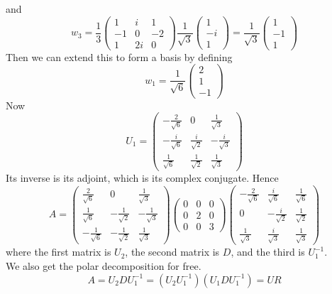 \documentclass[answers]{exam}
\begin{document}
\begin{questions}
\begin{solution}
	and
	$$w_3 = \frac{1}{3} \begin{pmatrix} 1 & i & 1 \\ -1 & 0 & -2 \\ 1 & 2i & 0 \end{pmatrix} \frac{1}{\sqrt{3}} \begin{pmatrix} 1 \\ -i \\ 1 \end{pmatrix} = \frac{1}{\sqrt{3}} \begin{pmatrix} 1 \\ -1 \\ 1 \end{pmatrix}$$
	Then we can extend this to form a basis by defining
	$$w_1 = \frac{1}{\sqrt{6}} \begin{pmatrix} 2 \\ 1 \\ -1 \end{pmatrix}$$
	Now
	$$U_1 = \begin{pmatrix} -\frac{2}{\sqrt{6}} & 0 & \frac{1}{\sqrt{3}} \\ -\frac{i}{\sqrt{6}} & \frac{i}{\sqrt{2}} & -\frac{i}{\sqrt{3}} \\ \frac{1}{\sqrt{6}} & \frac{1}{\sqrt{2}} & \frac{1}{\sqrt{3}} \end{pmatrix}$$
	Its inverse is its adjoint, which is its complex conjugate. Hence
	$$A = \begin{pmatrix} \frac{2}{\sqrt{6}} & 0 & \frac{1}{\sqrt{3}} \\ \frac{1}{\sqrt{6}} & -\frac{1}{\sqrt{2}} & -\frac{1}{\sqrt{3}} \\ -\frac{1}{\sqrt{6}} & -\frac{1}{\sqrt{2}} & \frac{1}{\sqrt{3}} \end{pmatrix} \begin{pmatrix} 0 & 0 & 0 \\ 0 & 2 & 0 \\ 0 & 0 & 3 \end{pmatrix} \begin{pmatrix} -\frac{2}{\sqrt{6}} & \frac{i}{\sqrt{6}} & \frac{1}{\sqrt{6}} \\ 0 & -\frac{i}{\sqrt{2}} & \frac{1}{\sqrt{2}} \\ \frac{1}{\sqrt{3}} & \frac{i}{\sqrt{3}} & \frac{1}{\sqrt{3}} \end{pmatrix}$$
	where the first matrix is $U_2$, the second matrix is $D$, and the third is $U_1^{-1}$. \\
	We also get the polar decomposition for free.
	$$A = U_2DU_1^{-1} = (U_2U_1^{-1})(U_1DU_1^{-1}) = UR$$

\end{solution}
\end{questions}
\end{document}
